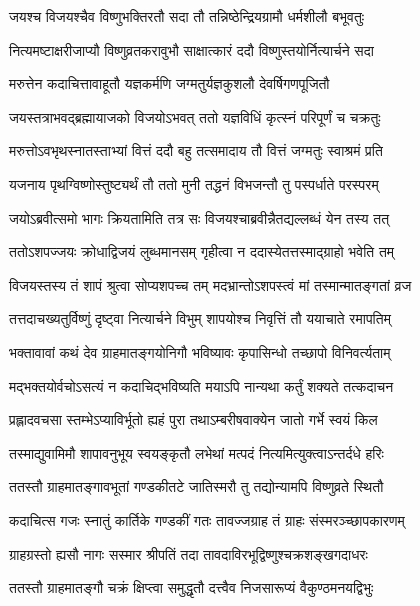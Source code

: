 \twolineshloka
{जयश्च विजयश्चैव विष्णुभक्तिरतौ सदा}
{तौ तन्निष्ठेन्द्रियग्रामौ धर्मशीलौ बभूवतुः} %

\twolineshloka
{नित्यमष्टाक्षरीजाप्यौ विष्णुव्रतकरावुभौ}
{साक्षात्कारं ददौ विष्णुस्तयोर्नित्यार्चने सदा} %

\twolineshloka
{मरुत्तेन कदाचित्तावाहूतौ यज्ञकर्मणि}
{जग्मतुर्यज्ञकुशलौ देवर्षिगणपूजितौ} %

\twolineshloka
{जयस्तत्राभवद्ब्रह्मायाजको विजयोऽभवत्}
{ततो यज्ञविधिं कृत्स्नं परिपूर्णं च चक्रतुः} %

\twolineshloka
{मरुत्तोऽवभृथस्नातस्ताभ्यां वित्तं ददौ बहु}
{तत्समादाय तौ वित्तं जग्मतुः स्वाश्रमं प्रति} %

\twolineshloka
{यजनाय पृथग्विष्णोस्तुष्ट्यर्थं तौ ततो मुनी}
{तद्धनं विभजन्तौ तु पस्पर्धाते परस्परम्} %

\twolineshloka
{जयोऽब्रवीत्समो भागः क्रियतामिति तत्र सः}
{विजयश्चाब्रवीन्नैतद्यल्लब्धं येन तस्य तत्} %

\twolineshloka
{ततोऽशपज्जयः क्रोधाद्विजयं लुब्धमानसम्}
{गृहीत्वा न ददास्येतत्तस्माद्ग्राहो भवेति तम्} %

\twolineshloka
{विजयस्तस्य तं शापं श्रुत्वा सोप्यशपच्च तम्}
{मदभ्रान्तोऽशपस्त्वं मां तस्मान्मातङ्गतां व्रज} %

\twolineshloka
{तत्तदाचख्यतुर्विष्णुं दृष्ट्वा नित्यार्चने विभुम्}
{शापयोश्च निवृत्तिं तौ ययाचाते रमापतिम्} %


\twolineshloka
{भक्तावावां कथं देव ग्राहमातङ्गयोनिगौ}
{भविष्यावः कृपासिन्धो तच्छापो विनिवर्त्यताम्} %


\twolineshloka
{मद्भक्तयोर्वचोऽसत्यं न कदाचिद्भविष्यति}
{मयाऽपि नान्यथा कर्तुं शक्यते तत्कदाचन} %

\twolineshloka
{प्रह्लादवचसा स्तम्भेऽप्याविर्भूतो ह्यहं पुरा}
{तथाऽम्बरीषवाक्येन जातो गर्भे स्वयं किल} %

\twolineshloka
{तस्माद्युवामिमौ शापावनुभूय स्वयङ्कृतौ}
{लभेथां मत्पदं नित्यमित्युक्त्वाऽन्तर्दधे हरिः} %

\twolineshloka
{ततस्तौ ग्राहमातङ्गावभूतां गण्डकीतटे}
{जातिस्मरौ तु तद्योन्यामपि विष्णुव्रते स्थितौ} %


\twolineshloka
{कदाचित्स गजः स्नातुं कार्तिके गण्डकीं गतः}
{तावज्जग्राह तं ग्राहः संस्मरञ्च्छापकारणम्} %

\twolineshloka
{ग्राहग्रस्तो ह्यसौ नागः सस्मार श्रीपतिं तदा}
{तावदाविरभूद्विष्णुश्चक्रशङ्खगदाधरः} %

\twolineshloka
{ततस्तौ ग्राहमातङ्गौ चक्रं क्षिप्त्वा समुद्धृतौ}
{दत्त्वैव निजसारूप्यं वैकुण्ठमनयद्विभुः} %

